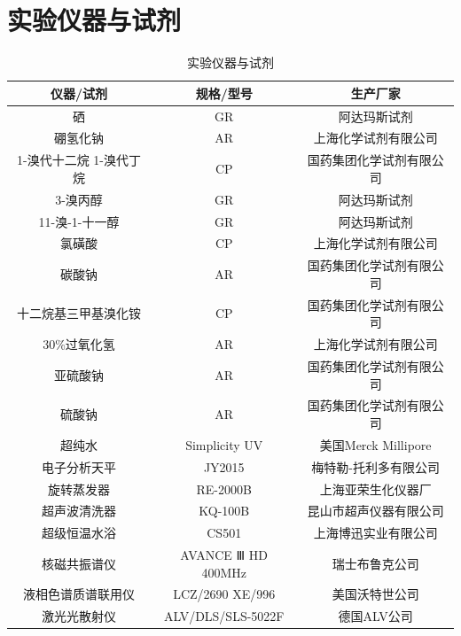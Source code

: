 \documentclass[bachelor,fandolfonts,replaceperiod]{jnuthesis}
\begin{document}
    \section{实验仪器与试剂}
        \begin{table}[htp]
        \centering
        \begin{tabular}{ccc}
            \toprule
            \textbf{仪器/试剂} & \textbf{规格/型号} & \textbf{生产厂家} \\
            \midrule
            硒   & GR & 阿达玛斯试剂 \\
            硼氢化钠  & AR  & 上海化学试剂有限公司 \\
            1-溴代十二烷
            1-溴代丁烷  & CP & 国药集团化学试剂有限公司 \\
            3-溴丙醇 & GR & 阿达玛斯试剂 \\
            11-溴-1-十一醇 & GR & 阿达玛斯试剂 \\
            氯磺酸  & CP & 上海化学试剂有限公司 \\
            碳酸钠  & AR & 国药集团化学试剂有限公司 \\
            十二烷基三甲基溴化铵 & CP & 国药集团化学试剂有限公司\\
            30\%过氧化氢  & AR & 上海化学试剂有限公司 \\
            亚硫酸钠  & AR & 国药集团化学试剂有限公司 \\
            硫酸钠  & AR & 国药集团化学试剂有限公司 \\
            超纯水 & Simplicity\ce{^{\textregistered}} UV & 美国Merck Millipore\\
            电子分析天平  & JY2015 & 梅特勒-托利多有限公司 \\
            旋转蒸发器  & RE-2000B & 上海亚荣生化仪器厂 \\
            超声波清洗器  & KQ-100B & 昆山市超声仪器有限公司 \\
            超级恒温水浴  & CS501 & 上海博迅实业有限公司 \\
            核磁共振谱仪  & AVANCE Ⅲ HD 400MHz & 瑞士布鲁克公司 \\
            液相色谱质谱联用仪  & LCZ/2690 XE/996 & 美国沃特世公司 \\
            激光光散射仪 & ALV/DLS/SLS-5022F & 德国ALV公司\\
            \bottomrule
        \end{tabular}
        \caption{实验仪器与试剂}\label{table:实验仪器与试剂}
    \end{table}
    
\end{document}
